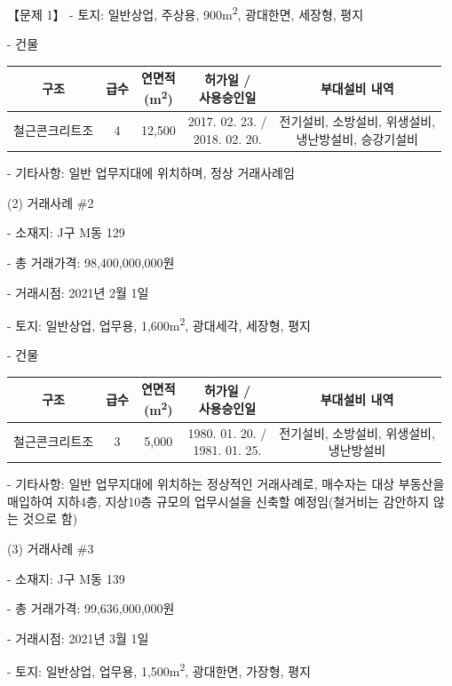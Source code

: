 \begin{longquestion}{【문제 1】}
- 토지: 일반상업, 주상용, 900m\textsuperscript{2}, 광대한면, 세장형, 평지 \par
- 건물 \par
{\small\centering
\begin{tabular}{|c|c|c|c|c|}\hline
구조 & 급수 & \makecell{연면적\\(m\textsuperscript{2})} & \makecell{허가일 /\\사용승인일} & 부대설비 내역 \\\hline
철근콘크리트조 & 4 & 12,500 & \makecell{2017. 02. 23. /\\2018. 02. 20.} & \makecell{전기설비, 소방설비, 위생설비,\\냉난방설비, 승강기설비} \\\hline
\end{tabular}\par}
- 기타사항: 일반 업무지대에 위치하며, 정상 거래사례임 \par
(2) 거래사례 \#2 \par
- 소재지: J구 M동 129 \par
- 총 거래가격: 98,400,000,000원 \par
- 거래시점: 2021년 2월 1일 \par
- 토지: 일반상업, 업무용, 1,600m\textsuperscript{2}, 광대세각, 세장형, 평지 \par
- 건물 \par
{\small\centering
\begin{tabular}{|c|c|c|c|c|}\hline
구조 & 급수 & \makecell{연면적\\(m\textsuperscript{2})} & \makecell{허가일 /\\사용승인일} & 부대설비 내역 \\\hline
철근콘크리트조 & 3 & 5,000 & \makecell{1980. 01. 20. /\\1981. 01. 25.} & \makecell{전기설비, 소방설비, 위생설비,\\냉난방설비} \\\hline
\end{tabular}\par}
- 기타사항: 일반 업무지대에 위치하는 정상적인 거래사례로, 매수자는 대상 부동산을 매입하여 지하4층, 지상10층 규모의 업무시설을 신축할 예정임(철거비는 감안하지 않는 것으로 함) \par
(3) 거래사례 \#3 \par
- 소재지: J구 M동 139 \par
- 총 거래가격: 99,636,000,000원 \par
- 거래시점: 2021년 3월 1일 \par
- 토지: 일반상업, 업무용, 1,500m\textsuperscript{2}, 광대한면, 가장형, 평지 \par

\end{longquestion}
